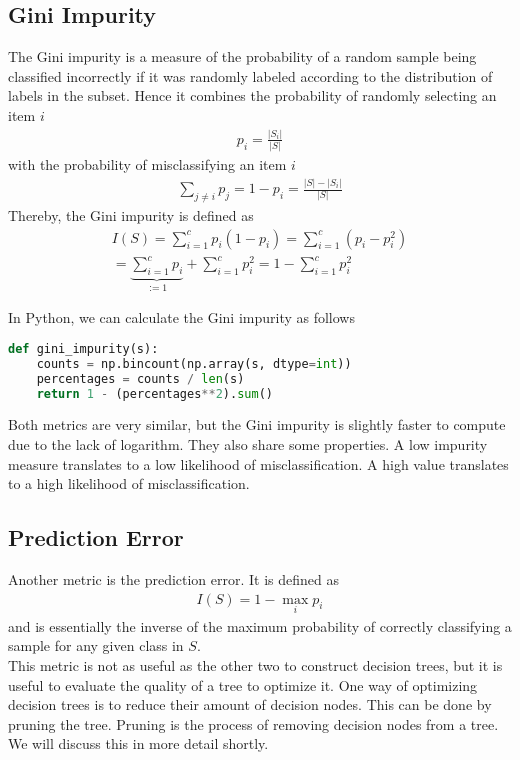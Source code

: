 \subsection{Gini Impurity}
The Gini impurity is a measure of the probability of a random sample being classified incorrectly if it was randomly labeled according to the distribution of labels in the subset. Hence it combines the probability of randomly selecting an item $i$
\begin{align}
  p_i = \frac{|S_i|}{|S|}
\end{align}
with the probability of misclassifying an item $i$
\begin{align}
  \sum_{j\neq i} p_j = 1 - p_i = \frac{|S| - |S_i|}{|S|}
\end{align}
Thereby, the Gini impurity is defined as
\begin{align}
  I(S) = \sum_{i=1}^cp_i (1 - p_i) = \sum_{i=1}^c (p_i - p_i^2)\\
  = \underbrace{\sum_{i=1}^c p_i}_{:= 1} + \sum_{i=1}^c p_i^2 = 1 - \sum_{i=1}^c p_i^2
\end{align}

In Python, we can calculate the Gini impurity as follows
\begin{lstlisting}[language=Python]
def gini_impurity(s):
    counts = np.bincount(np.array(s, dtype=int))
    percentages = counts / len(s)
    return 1 - (percentages**2).sum()
\end{lstlisting}

Both metrics are very similar, but the Gini impurity is slightly faster to compute due to the lack of logarithm.
They also share some properties. A low impurity measure translates to a low likelihood of misclassification. A high value translates to a high likelihood of misclassification.

\subsection{Prediction Error}
Another metric is the prediction error. It is defined as
\begin{align}
  I(S) = 1 - \max_i p_i
\end{align}
and is essentially the inverse of the maximum probability of correctly classifying a sample for any given class in $S$.\\
This metric is not as useful as the other two to construct decision trees, but it is useful to evaluate the quality of a tree to optimize it.
One way of optimizing decision trees is to reduce their amount of decision nodes.
This can be done by pruning the tree. Pruning is the process of removing decision nodes from a tree.
We will discuss this in more detail shortly.

